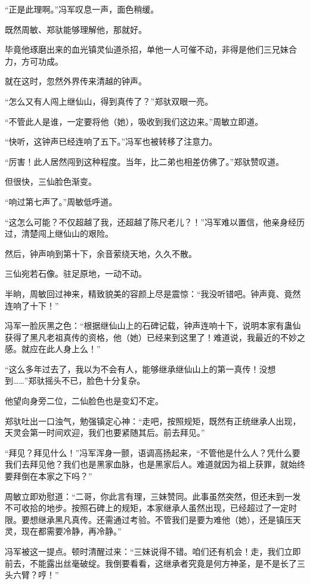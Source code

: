 \begin{this_body}
“正是此理啊。”冯军叹息一声，面色稍缓。

既然周敏、郑驮能够理解他，那就好。

毕竟他琢磨出来的血光镇灵仙道杀招，单他一人可催不动，非得是他们三兄妹合力，方可功成。

就在这时，忽然外界传来清越的钟声。

“怎么又有人闯上继仙山，得到真传了？”郑驮双眼一亮。

“不管此人是谁，一定要将他（她），吸收到我们这边来。”周敏立即道。

“快听，这钟声已经连响了五下。”冯军也被转移了注意力。

“厉害！此人居然闯到这种程度。当年，比二弟也相差仿佛了。”郑驮赞叹道。

但很快，三仙脸色渐变。

“响过第七声了。”周敏低呼道。

“这怎么可能？不仅超越了我，还超越了陈尺老儿？！”冯军难以置信，他亲身经历过，清楚闯上继仙山的艰险。

然后，钟声响到第十下，余音萦绕天地，久久不散。

三仙宛若石像。驻足原地，一动不动。

半晌，周敏回过神来，精致貌美的容颜上尽是震惊：“我没听错吧。钟声竟、竟然连响了十下！”

冯军一脸灰黑之色：“根据继仙山上的石碑记载，钟声连响十下，说明本家有蛊仙获得了黑凡老祖真传的资格，他（她）已经来到这里了！难道说，我最近的不妙之感。就应在此人身上么！”

“这么多年过去了，我以为不会有人，能够继承继仙山上的第一真传！没想到……”郑驮摇头不已，脸色十分复杂。

他望向身旁二位，二仙脸色也是变幻不定。

郑驮吐出一口浊气，勉强镇定心神：“走吧，按照规矩，既然有正统继承人出现，天灵会第一时间欢迎，我们也要紧随其后。前去拜见。”

“拜见？拜见什么！”冯军浑身一颤，语调高扬起来，“不管他是什么人？凭什么要我们去拜见他？我们也是黑家血脉，也是黑家后人。难道就因为祖上获罪，就始终要拜倒在本家之下吗？”

周敏立即劝慰道：“二哥，你此言有理，三妹赞同。此事虽然突然，但还未到一发不可收拾的地步。按照石碑上的规矩，本家继承人虽然出现，已经超过了一定时限。要想继承黑凡真传。还需通过考验。不管我们是要为难他（她），还是镇压天灵，现在都需要冷静，再冷静。”

冯军被这一提点。顿时清醒过来：“三妹说得不错。咱们还有机会！走，我们立即前去，不能露出丝毫破绽。我倒要看看，这继承者究竟是何方神圣，是不是长了三头六臂？哼！”


\end{this_body}
